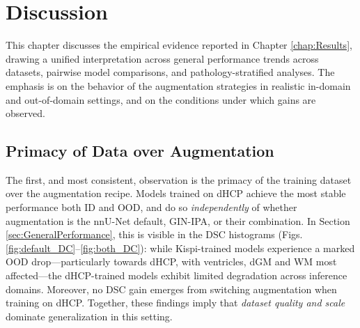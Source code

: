 \chapter{Discussion} \label{chap:Discussion}
\vspace{1cm}

This chapter discusses the empirical evidence reported in Chapter \ref{chap:Results}, drawing a unified interpretation across general performance trends across datasets, pairwise model comparisons, and pathology-stratified analyses. The emphasis is on the behavior of the augmentation strategies in realistic in-domain and out-of-domain settings, and on the conditions under which gains are observed.

\section{Primacy of Data over Augmentation}
The first, and most consistent, observation is the primacy of the training dataset over the augmentation recipe. Models trained on dHCP achieve the most stable performance both ID and OOD, and do so \emph{independently} of whether augmentation is the nnU-Net default, GIN-IPA, or their combination. In Section \ref{sec:GeneralPerformance}, this is visible in the DSC histograms (Figs.\,\ref{fig:default_DC}--\ref{fig:both_DC}): while Kispi-trained models experience a marked OOD drop---particularly towards dHCP, with ventricles, dGM and WM most affected---the dHCP-trained models exhibit limited degradation across inference domains. Moreover, no DSC gain emerges from switching augmentation when training on dHCP. Together, these findings imply that \emph{dataset quality and scale} dominate generalization in this setting.

